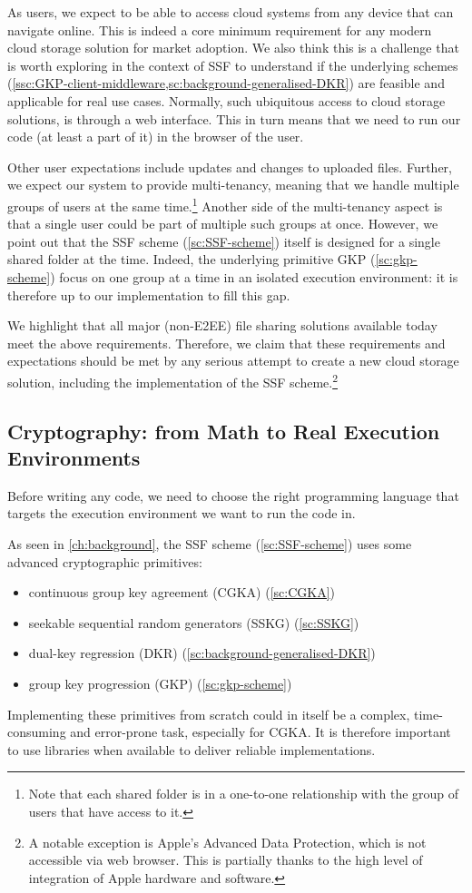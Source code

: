 As users, we expect to be able to access 
cloud systems from any device that can navigate online.
This is indeed a core minimum requirement for any modern
cloud storage solution for market adoption.
We also think this is a challenge that is worth exploring
in the context of SSF to understand if the underlying
schemes (\cref{ssc:GKP-client-middleware,sc:background-generalised-DKR})
are feasible and applicable for real use cases.
Normally, such ubiquitous access to cloud storage solutions,
is through a web interface.
This in turn means that we need to run our code (at least a part of it) 
in the browser of the user.

Other user expectations include updates and changes to uploaded files.
Further, we expect our system to provide multi-tenancy,
meaning that we handle multiple groups of users at the same time.\footnote{Note that each shared folder is in a one-to-one relationship with the group of users that have access to it.} 
Another side of the multi-tenancy aspect is that a 
single user could be part of multiple such groups at once. 
However, we point out that the SSF scheme (\cref{sc:SSF-scheme}) 
itself is designed for a single shared folder at the time.
Indeed, the underlying primitive GKP (\cref{sc:gkp-scheme}) focus 
on one group at a time in an isolated execution environment:
it is therefore up to our implementation to fill this gap.

We highlight that all major (non-E2EE) file sharing solutions available today meet the above requirements.
Therefore, we claim that these requirements and expectations should be met by any serious attempt to create a new cloud storage solution, including the implementation of the SSF scheme.\footnote{A notable exception is Apple's Advanced Data Protection, which is not accessible via web browser. This is partially thanks to the high level of integration of Apple hardware and software.}

\subsection{Cryptography: from Math to Real Execution Environments}\label{sc:abstract-to-real}

Before writing any code, we need to choose the right 
programming language that targets the execution environment
we want to run the code in.

As seen in \cref{ch:background}, the SSF scheme (\cref{sc:SSF-scheme})
uses some advanced cryptographic primitives:
\begin{itemize}
    \item continuous group key agreement (CGKA) (\cref{sc:CGKA})
    \item seekable sequential random generators (SSKG) (\cref{sc:SSKG})
    \item dual-key regression (DKR) (\cref{sc:background-generalised-DKR})
    \item group key progression (GKP) (\cref{sc:gkp-scheme})
\end{itemize}
Implementing these primitives from scratch could in itself
be a complex, time-consuming and error-prone task, especially for CGKA.
It is therefore important to use libraries when available
to deliver reliable implementations.

